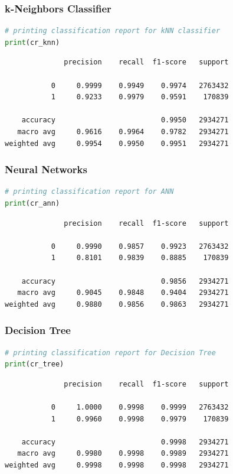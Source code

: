 \documentclass{article}
\begin{document}
\subsubsection{k-Neighbors Classifier}
\begin{lstlisting}[language=Python]
# printing classification report for kNN classifier
print(cr_knn)
\end{lstlisting}
\begin{verbatim}  
              precision    recall  f1-score   support

           0     0.9999    0.9949    0.9974   2763432
           1     0.9233    0.9979    0.9591    170839

    accuracy                         0.9950   2934271
   macro avg     0.9616    0.9964    0.9782   2934271
weighted avg     0.9954    0.9950    0.9951   2934271
\end{verbatim}

\subsubsection{Neural Networks}
\begin{lstlisting}[language=Python]
# printing classification report for ANN
print(cr_ann)
\end{lstlisting}
\begin{verbatim}    
              precision    recall  f1-score   support

           0     0.9990    0.9857    0.9923   2763432
           1     0.8101    0.9839    0.8885    170839

    accuracy                         0.9856   2934271
   macro avg     0.9045    0.9848    0.9404   2934271
weighted avg     0.9880    0.9856    0.9863   2934271
\end{verbatim}

\subsubsection{Decision Tree}
\begin{lstlisting}[language=Python]
# printing classification report for Decision Tree
print(cr_tree)
\end{lstlisting}
\begin{verbatim}
              precision    recall  f1-score   support

           0     1.0000    0.9998    0.9999   2763432
           1     0.9960    0.9998    0.9979    170839

    accuracy                         0.9998   2934271
   macro avg     0.9980    0.9998    0.9989   2934271
weighted avg     0.9998    0.9998    0.9998   2934271
\end{verbatim}
\end{document}

